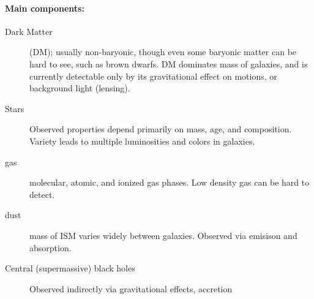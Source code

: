 \documentclass{article}
\begin{document}
\paragraph{Main components:}
\begin{description}
    \item [Dark Matter] (DM); usually non-baryonic, though even some baryonic
        matter can be hard to see, such as brown dwarfs. DM dominates mass of
        galaxies, and is currently detectable only by its gravitational effect
        on motions, or background light (lensing).
    \item [Stars] Observed properties depend primarily on mass, age,
        and composition. Variety leads to multiple luminosities and colors
        in galaxies.
    \item [gas] molecular, atomic, and ionized gas phases. Low density gas
        can be hard to detect.
    \item [dust] mass of ISM varies widely between galaxies. Observed via
        emisison and absorption.
    \item [Central (supermassive) black holes]
        Observed indirectly via gravitational effects, accretion
\end{description}
\end{document}
